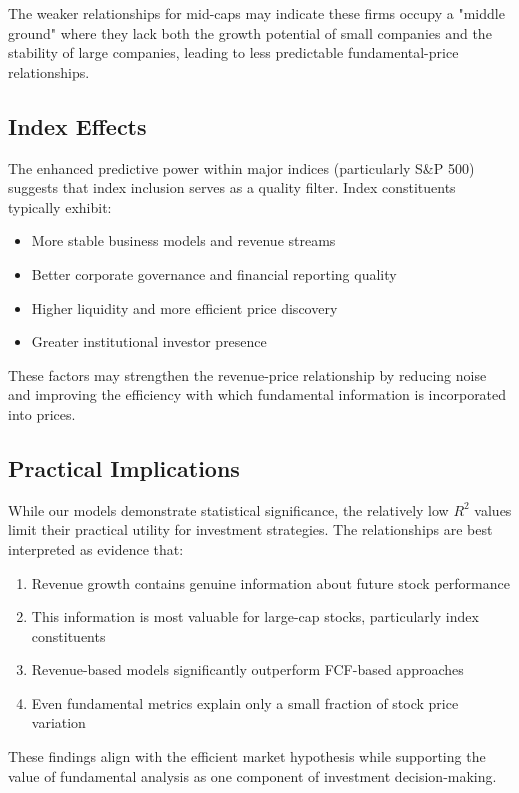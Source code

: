 \documentclass[11pt]{article}
\begin{document}
The weaker relationships for mid-caps may indicate these firms occupy a "middle ground" where they lack both the growth potential of small companies and the stability of large companies, leading to less predictable fundamental-price relationships.

\subsection{Index Effects}

The enhanced predictive power within major indices (particularly S\&P 500) suggests that index inclusion serves as a quality filter. Index constituents typically exhibit:
\begin{itemize}
\item More stable business models and revenue streams
\item Better corporate governance and financial reporting quality  
\item Higher liquidity and more efficient price discovery
\item Greater institutional investor presence
\end{itemize}

These factors may strengthen the revenue-price relationship by reducing noise and improving the efficiency with which fundamental information is incorporated into prices.

\subsection{Practical Implications}

While our models demonstrate statistical significance, the relatively low $R^2$ values limit their practical utility for investment strategies. The relationships are best interpreted as evidence that:

\begin{enumerate}
\item Revenue growth contains genuine information about future stock performance
\item This information is most valuable for large-cap stocks, particularly index constituents  
\item Revenue-based models significantly outperform FCF-based approaches
\item Even fundamental metrics explain only a small fraction of stock price variation
\end{enumerate}

These findings align with the efficient market hypothesis while supporting the value of fundamental analysis as one component of investment decision-making.
\end{document}
